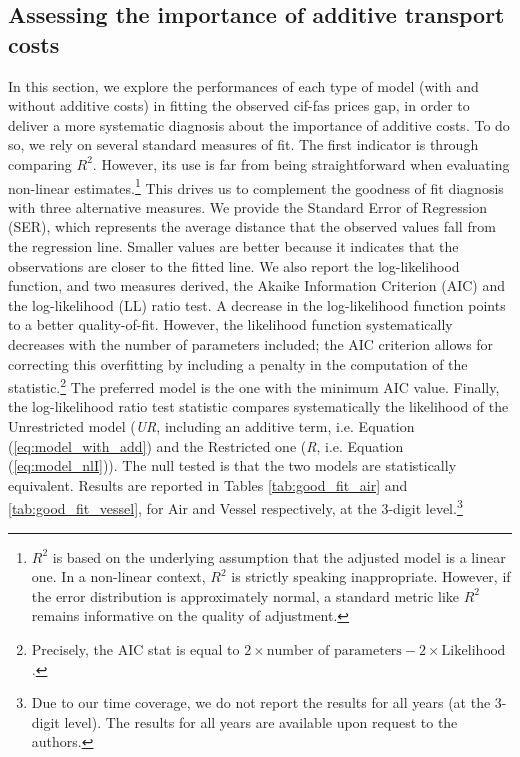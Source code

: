 \documentclass[a4paper,11pt]{article}
\begin{document}
\subsection{Assessing the importance of additive transport costs}

In this section, we explore the performances of each type of model (with and without additive costs) in fitting the observed cif-fas prices gap, in order to deliver a more systematic diagnosis about the importance of additive costs. To do so, we rely on several standard measures of fit. The first indicator is through comparing $R^{2}$. However, its use is far from being straightforward when evaluating non-linear estimates.\footnote{$R^2$ is based on the underlying assumption that the adjusted model is a linear one. In a non-linear context, $R^2$ is  strictly speaking inappropriate. However, if the error distribution is approximately normal, a standard metric like $R^2$ remains informative on the quality of adjustment.} This drives us to complement the goodness of fit diagnosis with three alternative measures. We provide the Standard Error of Regression (SER), which represents the average distance that the observed values fall from the regression line. Smaller values are better because it indicates that the observations are closer to the fitted line. We also report the log-likelihood function, and two measures derived, the Akaike Information Criterion (AIC) and the log-likelihood (LL) ratio test. A decrease in the log-likelihood function points to a better quality-of-fit. However, the likelihood function systematically decreases with the number of parameters included; the AIC criterion allows for correcting this overfitting by including a penalty in the computation of the statistic.\footnote{Precisely, the AIC stat is equal to $2 \times \textrm{number of parameters} - 2 \times \textrm{Likelihood} $.} The preferred model is the one with the minimum AIC value. Finally, the log-likelihood ratio test statistic compares systematically the likelihood of the Unrestricted model (\emph{UR}, including an additive term, i.e. Equation (\ref{eq:model_with_add}) and the Restricted one (\emph{R}, i.e. Equation (\ref{eq:model_nlI})). The null tested is that the two models are statistically equivalent. Results are reported in Tables \ref{tab:good_fit_air} and \ref{tab:good_fit_vessel}, for Air and Vessel respectively, at the 3-digit level.\footnote{Due to our time coverage, we do not report the results for all years (at the 3-digit level). The results for all years are available upon request to the authors.}\medskip
\end{document}

